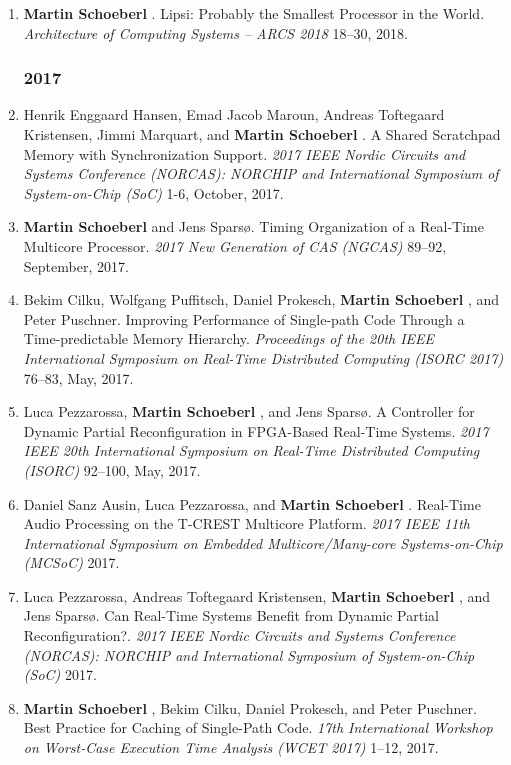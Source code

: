 \begin{enumerate}
\item {\bf Martin Schoeberl }.
 Lipsi: Probably the Smallest Processor in the World.
 \emph{Architecture of Computing Systems -- ARCS 2018} 18--30, 2018.


\subsubsection*{2017}

\item Henrik Enggaard Hansen, Emad Jacob Maroun, Andreas Toftegaard Kristensen, Jimmi Marquart, and {\bf Martin Schoeberl }.
 A Shared Scratchpad Memory with Synchronization Support.
 \emph{2017 IEEE Nordic Circuits and Systems Conference (NORCAS): NORCHIP and International Symposium of System-on-Chip (SoC)} 1-6, October, 2017.

\item {\bf Martin Schoeberl } and Jens Spars{\o}.
 Timing Organization of a Real-Time Multicore Processor.
 \emph{2017 New Generation of CAS (NGCAS)} 89--92, September, 2017.

\item Bekim Cilku, Wolfgang Puffitsch, Daniel Prokesch, {\bf Martin Schoeberl }, and Peter Puschner.
 Improving Performance of Single-path Code Through a Time-predictable Memory Hierarchy.
 \emph{Proceedings of the 20th IEEE International Symposium on Real-Time Distributed Computing (ISORC 2017)} 76--83, May, 2017.

\item Luca Pezzarossa, {\bf Martin Schoeberl }, and Jens Spars{\o}.
 A Controller for Dynamic Partial Reconfiguration in FPGA-Based Real-Time Systems.
 \emph{2017 IEEE 20th International Symposium on Real-Time Distributed Computing (ISORC)} 92--100, May, 2017.

\item Daniel Sanz Ausin, Luca Pezzarossa, and {\bf Martin Schoeberl }.
 Real-Time Audio Processing on the T-CREST Multicore Platform.
 \emph{2017 IEEE 11th International Symposium on Embedded Multicore/Many-core Systems-on-Chip (MCSoC)} 2017.

\item Luca Pezzarossa, Andreas Toftegaard Kristensen, {\bf Martin Schoeberl }, and Jens Spars{\o}.
 Can Real-Time Systems Benefit from Dynamic Partial Reconfiguration?.
 \emph{2017 IEEE Nordic Circuits and Systems Conference (NORCAS): NORCHIP and International Symposium of System-on-Chip (SoC)} 2017.

\item {\bf Martin Schoeberl }, Bekim Cilku, Daniel Prokesch, and Peter Puschner.
 Best Practice for Caching of Single-Path Code.
 \emph{17th International Workshop on Worst-Case Execution Time Analysis (WCET 2017)} 1--12, 2017.



\end{enumerate}
